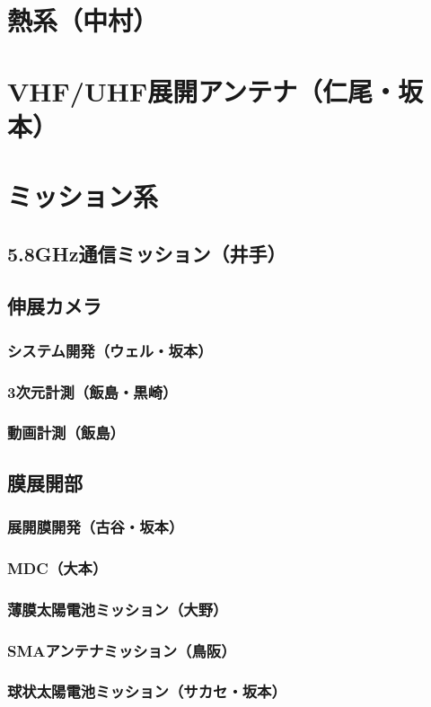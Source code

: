 \section{熱系（中村）}

\section{VHF/UHF展開アンテナ（仁尾・坂本）}

\section{ミッション系}
\subsection{5.8GHz通信ミッション（井手）}
\subsection{伸展カメラ}
\subsubsection{システム開発（ウェル・坂本）}
\subsubsection{3次元計測（飯島・黒崎）}
\subsubsection{動画計測（飯島）}
\subsection{膜展開部}
\subsubsection{展開膜開発（古谷・坂本）}
\subsubsection{MDC（大本）}
\subsubsection{薄膜太陽電池ミッション（大野）}
\subsubsection{SMAアンテナミッション（鳥阪）}
\subsubsection{球状太陽電池ミッション（サカセ・坂本）}





